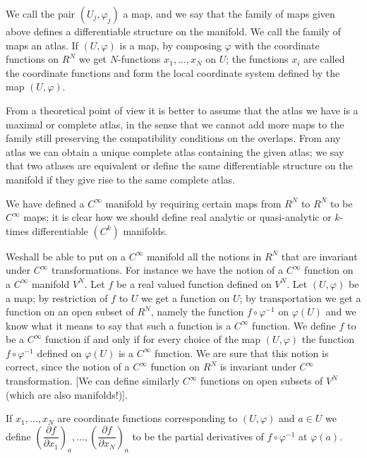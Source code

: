 We call the pair $(U_{j},\varphi_{j})$ a map, and we say that the
family of maps given above defines a differentiable structure on the
manifold. We call the family of maps an atlas. If $(U,\varphi)$ is a
map, by composing $\varphi$ with the coordinate functions on $R^{N}$
we get $N$-functions $x_{1},\ldots,x_{N}$ on $U$; the functions
$x_{i}$ are called the coordinate functions and form the local
coordinate system defined by the map $(U,\varphi)$.

From a theoretical point of view it is better to assume that the atlas
we have is a maximal or complete atlas, in the sense that we cannot
add more maps to the family still preserving the compatibility
conditions on the overlaps. From any atlas we can obtain a unique
complete atlas containing the given atlas; we say that two atlases are
equivalent or define the same differentiable structure on the manifold
if they give rise to the same complete atlas.

We have defined a $C^{\infty}$ manifold by requiring certain maps from
$R^{N}$ to $R^{N}$ to be $C^{\infty}$ maps; it is clear how we should
define real analytic or quasi-analytic or $k$-times differentiable
$(C^{k})$ manifolds. 

We\pageoriginale shall be able to put on a $C^{\infty}$ manifold all
the notions in $R^{N}$ that are invariant under $C^{\infty}$
transformations. For instance we have the notion of a $C^{\infty}$
function on a $C^{\infty}$ manifold $V^{N}$. Let $f$ be a real valued
function defined on $V^{N}$. Let $(U,\varphi)$ be a map; by
restriction of $f$ to $U$ we get a function on $U$; by transportation
we get a function on an open subset of $R^{N}$, namely the function
$f\circ \varphi^{-1}$ on $\varphi(U)$ and we know what it means to say
that such a function is a $C^{\infty}$ function. We define $f$ to be a
$C^{\infty}$ function if and only if for every choice of the map
$(U,\varphi)$ the function $f\circ \varphi^{-1}$ defined on
$\varphi(U)$ is a $C^{\infty}$ function. We are sure that this notion
is correct, since the notion of a $C^{\infty}$ function on $R^{N}$ is
invariant under $C^{\infty}$ transformation. [We can define similarly
  $C^{\infty}$ functions on open subsets of $V^{N}$ (which are also
  manifolds!)].

If $x_{1},\ldots,x_{N}$ are coordinate functions corresponding to
$(U,\varphi)$ and $a\in U$ we define $\left(\dfrac{\partial f}{\partial
  x_{1}}\right)_{a},\ldots,\left(\dfrac{\partial f}{\partial
  x_{N}}\right)_{a}$ to be the partial derivatives of $f\circ
\varphi^{-1}$ at $\varphi(a)$. 

